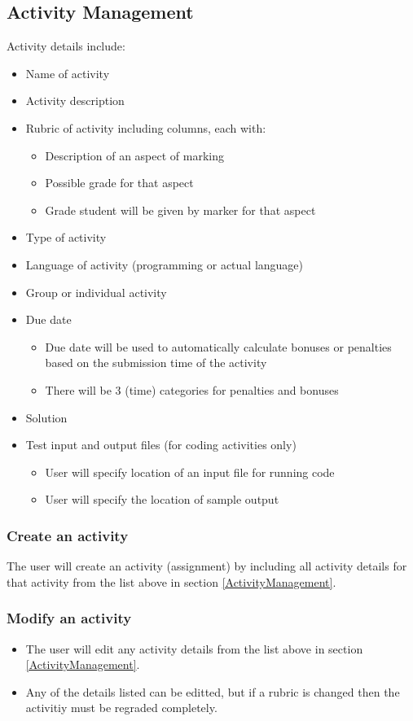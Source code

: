 \documentclass{article}
\begin{document}
\subsection{Activity Management \label{ActivityManagement}}
Activity details include:
\begin {itemize}
	\item Name of activity
	\item Activity description
	\item Rubric of activity including columns, each with:
	\begin{itemize}
		\item Description of an aspect of marking
		\item Possible grade for that aspect 
		\item Grade student will be given by marker for that aspect
	\end{itemize}
	\item Type of activity
	\item Language of activity (programming or actual language)
	\item Group or individual activity
	\item Due date 
	\begin{itemize}
		\item Due date will be used to automatically calculate bonuses or 
			penalties based on the submission time of the activity
		\item There will be 3 (time) categories for penalties and bonuses
	\end{itemize}
	\item Solution
	\item Test input and output files (for coding activities only)
	\begin{itemize}
		\item User will specify location of an input file for running code
		\item User will specify the location of sample output
	\end{itemize}
\end {itemize}
\subsubsection{Create an activity \label{CreateAct}}
The user will create an activity (assignment) by including all activity
details for that activity from the list above in section \ref{ActivityManagement}.
\subsubsection{Modify an activity \label{ModifyAct}}
\begin{itemize}
	\item The user will edit any activity details from the list above in section 
		\ref{ActivityManagement}.
	\item Any of the details listed can be editted, but if a rubric is changed then
		the activitiy must be regraded completely.
\end{itemize}
\end{document}
